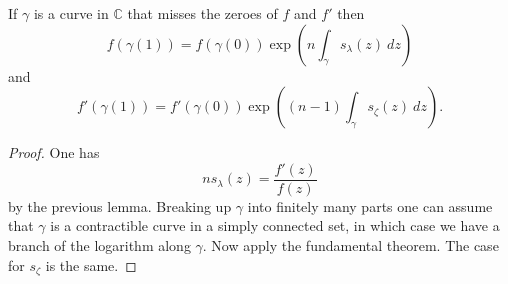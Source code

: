 \documentclass[12pt]{article}
\newcommand{\CC}{\mathbb{C}}
\begin{document}
\begin{lemma}
If $\gamma$ is a curve in $\CC$ that misses the zeroes of $f$ and $f'$ then
$$f(\gamma(1)) = f(\gamma(0)) \exp\left(n \int_\gamma s_\lambda(z) ~dz\right)$$
and
$$f'(\gamma(1)) = f'(\gamma(0)) \exp\left((n-1) \int_\gamma s_\zeta(z) ~dz\right).$$
\end{lemma}
\begin{proof}
One has
$$ns_\lambda(z) = \frac{f'(z)}{f(z)}$$
by the previous lemma. Breaking up $\gamma$ into finitely many parts one can assume that $\gamma$ is a contractible curve in a simply connected set, in which case we have a branch of the logarithm along $\gamma$.
Now apply the fundamental theorem.
The case for $s_\zeta$ is the same.
\end{proof}
\end{document}

